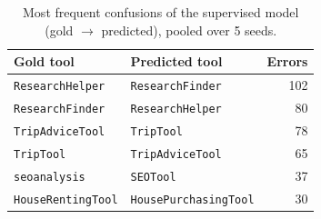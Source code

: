 \begin{table}[t]\centering\caption{Most frequent confusions of the supervised model (gold $\rightarrow$ predicted), pooled over 5 seeds.}\label{tab:conf}\small\begin{tabular}{llr}\toprule Gold tool & Predicted tool & Errors\\\midrule
\texttt{ResearchHelper} & \texttt{ResearchFinder} & 102\\
\texttt{ResearchFinder} & \texttt{ResearchHelper} & 80\\
\texttt{TripAdviceTool} & \texttt{TripTool} & 78\\
\texttt{TripTool} & \texttt{TripAdviceTool} & 65\\
\texttt{seoanalysis} & \texttt{SEOTool} & 37\\
\texttt{HouseRentingTool} & \texttt{HousePurchasingTool} & 30\\
\bottomrule\end{tabular}\end{table}